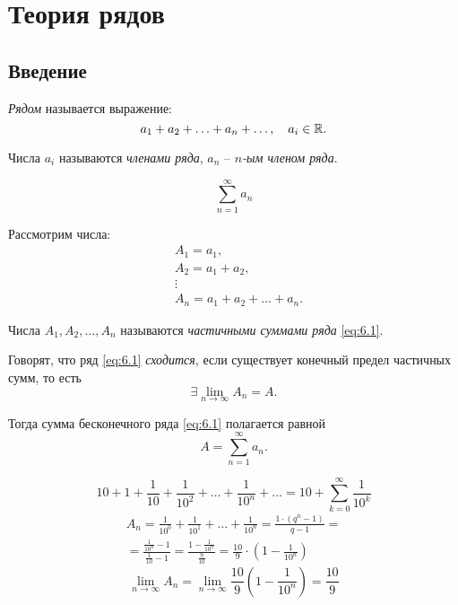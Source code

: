 \chapter{Теория рядов}

\section{Введение}

\begin{definition}[Ряд]
    \emph{Рядом} называется выражение:
    \[
        a_1 + a_2 + \ldots + a_n + \ldots, \quad a_i \in \mathbb{R}.
    \]

    Числа $ a_i $ называются \emph{членами ряда}, $ a_n $ -- \emph{$ n $-ым членом ряда}.

    \begin{equation}\label{eq:6.1}
        \sum_{n=1}^{\infty}a_n
    \end{equation}

    Рассмотрим числа:
    \begin{align*}
         & A_1 = a_1,                      \\
         & A_2 = a_1 + a_2,                \\
         & \vdots                          \\
         & A_n = a_1 + a_2 + \ldots + a_n.
    \end{align*}

    Числа $ A_1,A_2,\ldots,A_n $ называются \emph{частичными суммами ряда} \ref{eq:6.1}.
\end{definition}

\begin{definition}
    Говорят, что ряд \ref{eq:6.1} \emph{сходится}, если существует конечный предел частичных сумм, то есть
    \[
        \exists \underset{n\rightarrow\infty}{\lim}A_n = A.
    \]

    Тогда сумма бесконечного ряда \ref{eq:6.1} полагается равной
    \[
        A = \sum_{n=1}^{\infty}a_n.
    \]
\end{definition}

\newpage

\begin{example}
    \[
        10 + 1 + \frac{1}{10} + \frac{1}{10^2} + \ldots + \frac{1}{10^n} + \ldots = 10 + \sum_{k=0}^{\infty}\frac{1}{10^k}
    \]
    \begin{multline*}
        A_n = \frac{1}{10^0} + \frac{1}{10^1} + \ldots + \frac{1}{10^n} = \frac{1\cdot(q^n - 1)}{q - 1} = \\
        = \frac{\frac{1}{10^n} - 1}{\frac{1}{10} - 1} = \frac{1 - \frac{1}{10^n}}{\frac{9}{10}} = \frac{10}{9} \cdot \left(1 - \frac{1}{10^n}\right)
    \end{multline*}
    \[
        \underset{n\rightarrow\infty}{\lim}A_n = \underset{n\rightarrow\infty}{\lim}\frac{10}{9}\left(1-\frac{1}{10^n}\right) = \frac{10}{9}
    \]
\end{example}

